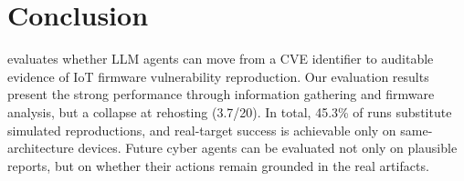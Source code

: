 \section{Conclusion}
\sys{} evaluates whether LLM agents can move from a CVE identifier to auditable evidence of IoT firmware vulnerability reproduction. Our evaluation results present the strong performance through information gathering and firmware analysis, but a collapse at rehosting (3.7/20). In total, 45.3\% of runs substitute simulated reproductions, and real-target success is achievable only on same-architecture devices. Future cyber agents can be evaluated not only on plausible reports, but on whether their actions remain grounded in the real artifacts.

